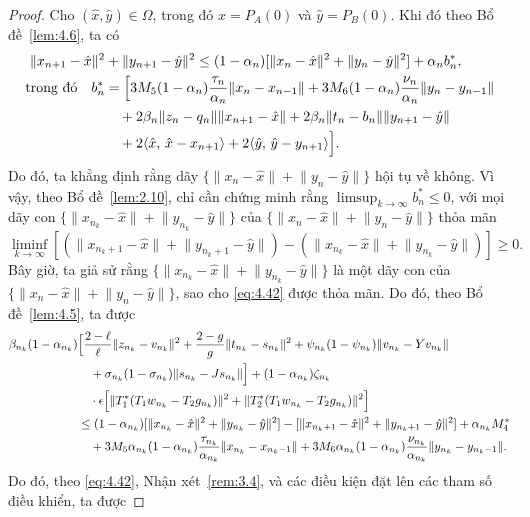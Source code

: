 \documentclass[11pt,a4paper]{article}
\theoremstyle{plain}
\theoremstyle{definition}
\theoremstyle{remark}
\numberwithin{equation}{section}
\newcommand{\inp}[2]{\langle #1,\,#2\rangle}
\newcommand{\nm}[1]{\lVert #1\rVert}
\begin{document}
\begin{proof}
Cho $(\hat{x},\hat{y})\in\Omega$, trong đó $\hat{x}=P_A(0)$ và $\hat{y}=P_B(0)$. Khi đó theo Bổ đề~\ref{lem:4.6}, ta có
\begin{align}
\nm{x_{n+1}-\hat{x}}^2 &+ \nm{y_{n+1}-\hat{y}}^2\le(1-\alpha_n)[\nm{x_n-\hat{x}}^2+\nm{y_n-\hat{y}}^2]+\alpha_n b_n^{*},\notag\\
\text{trong đó}\quad b_n^{*} &= \Bigl[3M_5(1-\alpha_n)\frac{\tau_n}{\alpha_n}\nm{x_n-x_{n-1}}+3M_6(1-\alpha_n)\frac{\nu_n}{\alpha_n}\nm{y_n-y_{n-1}}\notag\\
&\quad +2\beta_n\nm{z_n-q_n}\nm{x_{n+1}-\hat{x}}+2\beta_n\nm{t_n-b_n}\nm{y_{n+1}-\hat{y}}\notag\\
&\quad +2\inp{\hat{x}}{\hat{x}-x_{n+1}}+2\inp{\hat{y}}{\hat{y}-y_{n+1}}\Bigr]. \label{eq:4.41}
\end{align}
Do đó, ta khẳng định rằng dãy $\{\nm{x_n-\hat{x}}+\nm{y_n-\hat{y}}\}$ hội tụ về không. Vì vậy, theo Bổ đề~\ref{lem:2.10}, chỉ cần chứng minh rằng $\limsup_{k\to\infty}b_n^{*}\le 0$, với mọi dãy con $\{\nm{x_{n_k}-\hat{x}}+\nm{y_{n_k}-\hat{y}}\}$ của $\{\nm{x_n-\hat{x}}+\nm{y_n-\hat{y}}\}$ thỏa mãn
\begin{equation}
\liminf_{k\to\infty}[(\nm{x_{n_k+1}-\hat{x}}+\nm{y_{n_k+1}-\hat{y}})-(\nm{x_{n_k}-\hat{x}}+\nm{y_{n_k}-\hat{y}})]\ge 0. \label{eq:4.42}
\end{equation}
Bây giờ, ta giả sử rằng $\{\nm{x_{n_k}-\hat{x}}+\nm{y_{n_k}-\hat{y}}\}$ là một dãy con của $\{\nm{x_n-\hat{x}}+\nm{y_n-\hat{y}}\}$, sao cho \eqref{eq:4.42} được thỏa mãn. Do đó, theo Bổ đề~\ref{lem:4.5}, ta được
\begin{align*}
\beta_{n_k}(1-\alpha_{n_k}) &\Bigl[\frac{2-\ell}{\ell}\nm{z_{n_k}-v_{n_k}}^2+\frac{2-g}{g}\nm{t_{n_k}-s_{n_k}}^2+\psi_{n_k}(1-\psi_{n_k})\nm{v_{n_k}-Yv_{n_k}}\\
&\quad +\sigma_{n_k}(1-\sigma_{n_k})\nm{s_{n_k}-Js_{n_k}}\Bigr]+(1-\alpha_{n_k})\zeta_{n_k}\\
&\quad \cdot\epsilon\Bigl[\nm{T_1^{*}(T_1w_{n_k}-T_2g_{n_k})}^2+\nm{T_2^{*}(T_1w_{n_k}-T_2g_{n_k})}^2\Bigr]\\
&\le (1-\alpha_{n_k})[\nm{x_{n_k}-\hat{x}}^2+\nm{y_{n_k}-\hat{y}}^2]-[\nm{x_{n_k+1}-\hat{x}}^2+\nm{y_{n_k+1}-\hat{y}}^2]+\alpha_{n_k}M_4^{*}\\
&\quad +3M_5\alpha_{n_k}(1-\alpha_{n_k})\frac{\tau_{n_k}}{\alpha_{n_k}}\nm{x_{n_k}-x_{n_k-1}}+3M_6\alpha_{n_k}(1-\alpha_{n_k})\frac{\nu_{n_k}}{\alpha_{n_k}}\nm{y_{n_k}-y_{n_k-1}}.
\end{align*}
Do đó, theo \eqref{eq:4.42}, Nhận xét~\ref{rem:3.4}, và các điều kiện đặt lên các tham số điều khiển, ta được

\end{proof}
\end{document}
